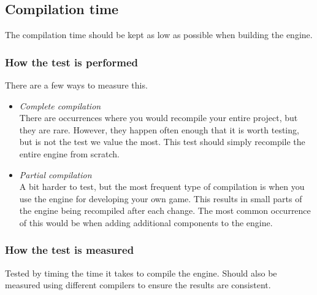 \subsection{Compilation time}
The compilation time should be kept as low as possible when building the engine.


\subsubsection*{How the test is performed}
There are a few ways to measure this.

\begin{itemize}

    \item \noindent\textit{Complete compilation}\\
    There are occurrences where you would recompile your entire project, but they are rare.
    However, they happen often enough that it is worth testing, but is not the test we value the most. This test should simply recompile the entire engine from scratch.

    \item \noindent\textit{Partial compilation}\\
    A bit harder to test, but the most frequent type of compilation is when you use the engine for developing your own game.
    This results in small parts of the engine being recompiled after each change.
    The most common occurrence of this would be when adding additional components to the engine.

\end{itemize}

\subsubsection*{How the test is measured}
Tested by timing the time it takes to compile the engine. Should also be measured using different compilers to ensure the results are consistent.